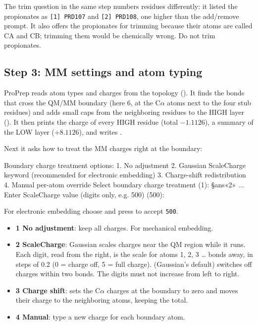 \begin{watchout}
The trim question in the same step numbers residues differently: it listed
the propionates as \texttt{[1] PRD107} and \texttt{[2] PRD108}, one higher than
the add/remove prompt. It also offers the propionates for trimming because
their atoms are called CA and CB; trimming them would be chemically wrong.
Do not trim propionates.
\end{watchout}

\subsection*{Step 3: MM settings and atom typing}

ProPrep reads atom types and charges from the topology (). It finds the bonds that cross the QM/MM
boundary (here 6, at the C$\alpha$ atoms next to the four stub residues) and
adds small caps from the neighboring residues to the HIGH layer
(). It then prints the charge of every
HIGH residue (total $-1.1126$), a summary of the LOW layer ($+8.1126$), and
writes .

\label{sec:qmmm-boundary}
Next it asks how to treat the MM charges right at the boundary:

\begin{screen}
Boundary charge treatment options:
  1. No adjustment
  2. Gaussian ScaleCharge keyword (recommended for electronic embedding)
  3. Charge-shift redistribution
  4. Manual per-atom override
Select boundary charge treatment (1): §ans«2»
...
Enter ScaleCharge value (digits only, e.g. 500) (500):
\end{screen}

For electronic embedding choose  and press  to accept
\texttt{500}.

\begin{itemize}
  \item \textbf{1 No adjustment}: keep all charges. For mechanical embedding.
  \item \textbf{2 ScaleCharge}: Gaussian scales charges near the QM region
        while it runs. Each digit, read from the right, is the scale for
        atoms 1, 2, 3 \ldots{} bonds away, in steps of 0.2 (0 = charge off,
        5 = full charge).  (Gaussian's default) switches off
        charges within two bonds. The digits must not increase from left to
        right.
  \item \textbf{3 Charge shift}: sets the C$\alpha$ charges at the boundary to
        zero and moves their charge to the neighboring atoms, keeping the
        total.
  \item \textbf{4 Manual}: type a new charge for each boundary atom.
\end{itemize}

